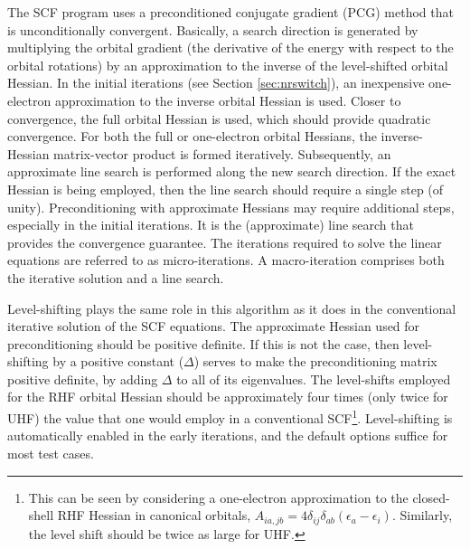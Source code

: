 
The SCF program uses a preconditioned conjugate gradient (PCG) method
that is unconditionally convergent.  Basically, a search direction is
generated by multiplying the orbital gradient (the derivative of the
energy with respect to the orbital rotations) by an approximation to
the inverse of the level-shifted orbital Hessian.  In the initial
iterations (see Section \ref{sec:nrswitch}), an inexpensive
one-electron approximation to the inverse orbital Hessian is used.
Closer to convergence, the full orbital Hessian is used, which should
provide quadratic convergence.  For both the full or one-electron
orbital Hessians, the inverse-Hessian matrix-vector product is formed
iteratively.  Subsequently, an approximate line search is performed
along the new search direction.  If the exact Hessian is being
employed, then the line search should require a single step (of
unity).  Preconditioning with approximate Hessians may require
additional steps, especially in the initial iterations.  It is the
(approximate) line search that provides the convergence guarantee.
The iterations required to solve the linear equations are referred to
as micro-iterations.  A macro-iteration comprises both the iterative
solution and a line search.

Level-shifting plays the same role in this algorithm as
it does in the conventional iterative solution of the SCF equations.
The approximate Hessian used for preconditioning should be positive
definite.  If this is not the case, then level-shifting by a positive
constant ($\Delta$) serves to make the preconditioning matrix positive
definite, by adding $\Delta$ to all of its eigenvalues.  The
level-shifts employed for the RHF orbital Hessian should be
approximately four times (only twice for UHF) the value that one would
employ in a conventional SCF\footnote{This can be seen by considering
  a one-electron approximation to the closed-shell RHF Hessian in
  canonical orbitals, $A_{ia,jb} = 4 \delta_{ij} \delta_{ab}
  (\epsilon_a - \epsilon_i)$.  Similarly, the level shift
  should be twice as large for UHF.}.  Level-shifting is automatically enabled
in the early iterations, and the default options suffice for most test
cases.

